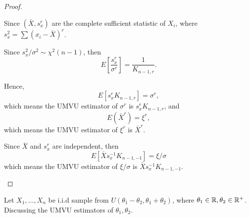 \begin{proof}
\begin{enumerate}
		      Since \((\bar{X},s_{x}^{r})\) are the complete sufficient statistic of \(X_{i}\), where \(s_{x}^{2}=\sum\left(x_{i}-\bar{X}\right)^{r}\).

		      Since \(s_x^2/\sigma^2\sim\chi^2(n-1)\), then
		      \begin{equation*}
			      E\left[\frac{s_x^r}{\sigma^r}\right]=\frac{1}{K_{n-1,r}}.
		      \end{equation*}

		      Hence,
		      \begin{equation*}
			      E\left[s_{x}^{r}K_{n-1,r}\right]=\sigma^r,
		      \end{equation*}
		      which means the UMVU estimator of \(\sigma^r\) is \(s_{x}^{r}K_{n-1,r}\),
		      and
		      \begin{equation*}
			      E(\bar{X}^r)=\xi^r,
		      \end{equation*}
		      which means the UMVU estimator of \(\xi^r\) is \(\bar{X}^r\).

		      Since \(\bar{X}\) and \(s_x^r\) are independent, then
		      \begin{equation*}
			      E[\bar{X}s_x^{-1}K_{n-1,-1}]=\xi/\sigma
		      \end{equation*}
		      which means the UMVU estimator of \(\xi/\sigma\) is \(\bar{X}s_x^{-1}K_{n-1,-1}\).
	\end{enumerate}
\end{proof}

\begin{example}[]
	Let \(X_{1},\ldots,X_{n}\) be i.i.d sample from \(U\left(\theta_1-\theta_2,\theta_1+\theta_2\right)\), where \(\theta_1\in\mathbb{R},\theta_2\in\mathbb{R}^+\). Discussing the UMVU estimators of \(\theta_1,\theta_2\).
\end{example}

